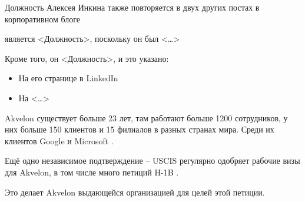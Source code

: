Должность Алексея Инкина  также повторяется в двух других постах в корпоративном блоге



\MrAkvelon является <Должность>, поскольку он был <\dots>

Кроме того, он <Должность>, и это указано:

\vspace{-0.5\baselineskip}
\vspace{-0.5\baselineskip}
\begin{itemize}[nosep]

    \item На его странице в LinkedIn 

    \item На <\dots> 

\end{itemize}



Akvelon существует больше 23 лет, там работают больше 1200 сотрудников, у них больше 150 клиентов и 15 филиалов в разных странах мира.
Среди их клиентов Google и Microsoft .

Ещё одно независимое подтверждение -- USCIS регулярно одобряет рабочие визы для Akvelon,
в том числе много петиций H-1B .

Это делает Akvelon выдающейся организацией для целей этой петиции.
